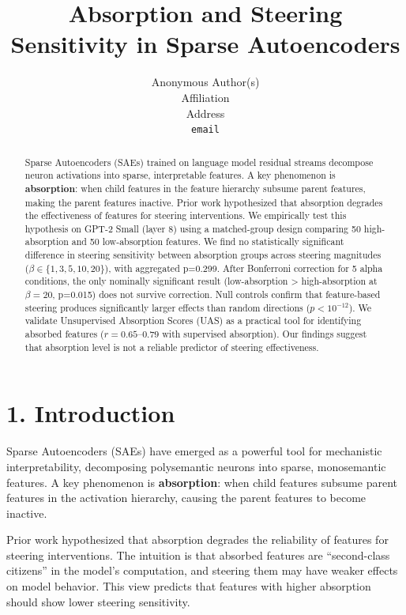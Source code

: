 \documentclass{article}
\title{Absorption and Steering Sensitivity in Sparse Autoencoders}
\author{%
  Anonymous Author(s) \\
  Affiliation \\
  Address \\
  \texttt{email} \\
}
\begin{document}
\maketitle


\begin{abstract}
Sparse Autoencoders (SAEs) trained on language model residual streams decompose neuron activations into sparse, interpretable features. A key phenomenon is \textbf{absorption}: when child features in the feature hierarchy subsume parent features, making the parent features inactive. Prior work hypothesized that absorption degrades the effectiveness of features for steering interventions. We empirically test this hypothesis on GPT-2 Small (layer 8) using a matched-group design comparing 50 high-absorption and 50 low-absorption features. We find no statistically significant difference in steering sensitivity between absorption groups across steering magnitudes ($\beta \in \{1, 3, 5, 10, 20\}$), with aggregated p=0.299. After Bonferroni correction for 5 alpha conditions, the only nominally significant result (low-absorption > high-absorption at $\beta=20$, p=0.015) does not survive correction. Null controls confirm that feature-based steering produces significantly larger effects than random directions ($p < 10^{-12}$). We validate Unsupervised Absorption Scores (UAS) as a practical tool for identifying absorbed features ($r = 0.65$--$0.79$ with supervised absorption). Our findings suggest that absorption level is not a reliable predictor of steering effectiveness.
\end{abstract}


\section{1. Introduction}

Sparse Autoencoders (SAEs) have emerged as a powerful tool for mechanistic interpretability, decomposing polysemantic neurons into sparse, monosemantic features. A key phenomenon is \textbf{absorption}: when child features subsume parent features in the activation hierarchy, causing the parent features to become inactive.

Prior work \citep{Bricken2023} hypothesized that absorption degrades the reliability of features for steering interventions. The intuition is that absorbed features are ``second-class citizens'' in the model's computation, and steering them may have weaker effects on model behavior. This view predicts that features with higher absorption should show lower steering sensitivity.
\end{document}
